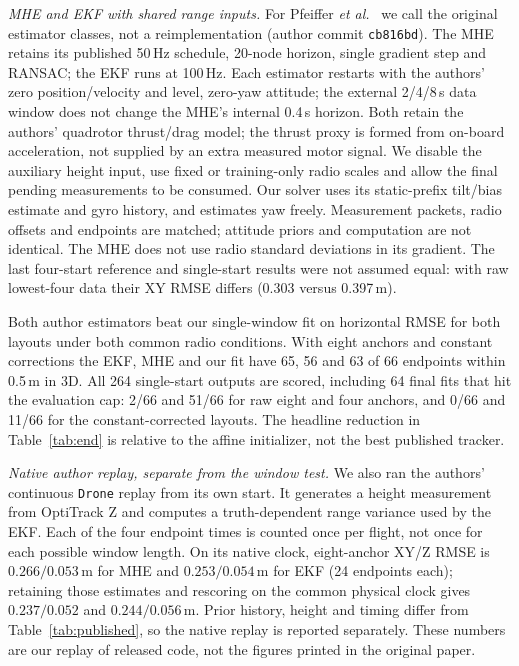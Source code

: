 \documentclass[conference,letterpaper,10pt]{IEEEtran}
\begin{document}
\emph{MHE and EKF with shared range inputs.} For Pfeiffer \emph{et al.}~\cite{pfeiffer} we call the original estimator classes, not a reimplementation (author commit \texttt{cb816bd}). The MHE retains its published 50\,Hz schedule, 20-node horizon, single gradient step and RANSAC; the EKF runs at 100\,Hz. Each estimator restarts with the authors' zero position/velocity and level, zero-yaw attitude; the external 2/4/8\,s data window does not change the MHE's internal 0.4\,s horizon. Both retain the authors' quadrotor thrust/drag model; the thrust proxy is formed from on-board acceleration, not supplied by an extra measured motor signal. We disable the auxiliary height input, use fixed or training-only radio scales and allow the final pending measurements to be consumed. Our solver uses its static-prefix tilt/bias estimate and gyro history, and estimates yaw freely. Measurement packets, radio offsets and endpoints are matched; attitude priors and computation are not identical. The MHE does not use radio standard deviations in its gradient. The last four-start reference and single-start results were not assumed equal: with raw lowest-four data their XY RMSE differs (0.303 versus 0.397\,m).

Both author estimators beat our single-window fit on horizontal RMSE for both layouts under both common radio conditions. With eight anchors and constant corrections the EKF, MHE and our fit have 65, 56 and 63 of 66 endpoints within 0.5\,m in 3D. All 264 single-start outputs are scored, including 64 final fits that hit the evaluation cap: 2/66 and 51/66 for raw eight and four anchors, and 0/66 and 11/66 for the constant-corrected layouts. The headline reduction in Table~\ref{tab:end} is relative to the affine initializer, not the best published tracker.

\emph{Native author replay, separate from the window test.} We also ran the authors' continuous \texttt{Drone} replay from its own start. It generates a height measurement from OptiTrack Z and computes a truth-dependent range variance used by the EKF. Each of the four endpoint times is counted once per flight, not once for each possible window length. On its native clock, eight-anchor XY/Z RMSE is $0.266/0.053$\,m for MHE and $0.253/0.054$\,m for EKF (24 endpoints each); retaining those estimates and rescoring on the common physical clock gives $0.237/0.052$ and $0.244/0.056$\,m. Prior history, height and timing differ from Table~\ref{tab:published}, so the native replay is reported separately. These numbers are our replay of released code, not the figures printed in the original paper.
\end{document}
